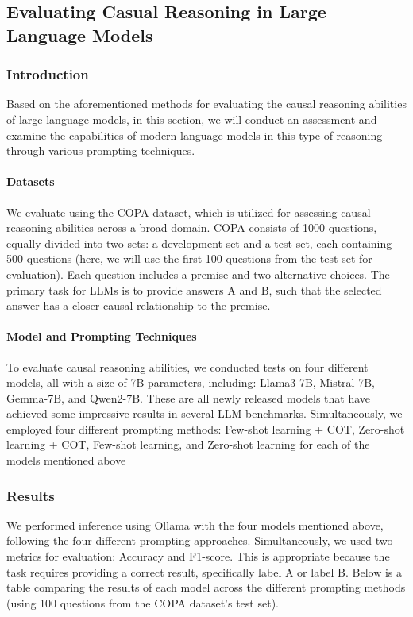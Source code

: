 \subsection{Evaluating Casual Reasoning in Large Language Models}

\subsubsection{Introduction}
Based on the aforementioned methods for evaluating the causal reasoning abilities of large language models, in this section, we will conduct an assessment 
and examine the capabilities of modern language models in this type of reasoning through various prompting techniques.

\paragraph{Datasets} We evaluate using the COPA dataset, which is utilized for assessing causal reasoning abilities across a broad domain. 
COPA consists of 1000 questions, equally divided into two sets: a development set and a test set, each containing 500 questions (here, we will use the first 100 questions from the test set for evaluation). Each question includes a premise and two alternative choices. 
The primary task for LLMs is to provide answers A and B, such that the selected answer has a closer causal relationship to the premise.

\paragraph{Model and Prompting Techniques} To evaluate causal reasoning abilities, we conducted tests on four different models, all with a size of 7B parameters, including: Llama3-7B, Mistral-7B, Gemma-7B, and Qwen2-7B.
These are all newly released models that have achieved some impressive results in several LLM benchmarks. Simultaneously, we employed four different prompting methods: Few-shot learning + COT, Zero-shot learning + COT, Few-shot learning, and Zero-shot learning for each of the models mentioned above

\subsubsection{Results}
We performed inference using Ollama with the four models mentioned above, following the four different prompting approaches. Simultaneously, we used two metrics for evaluation: Accuracy and F1-score. This is appropriate because the task requires providing a correct result, specifically label A or label B. 
Below is a table comparing the results of each model across the different prompting methods (using 100 questions from the COPA dataset's test set).

